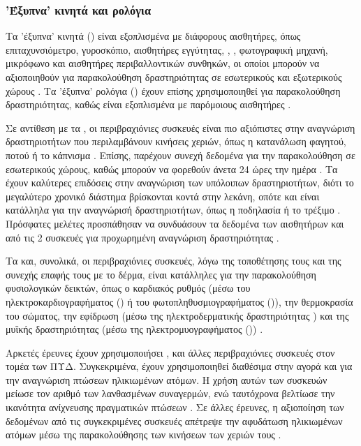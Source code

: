 \subsubsection{'Έξυπνα' κινητά και ρολόγια}
Τα 'έξυπνα' κινητά () είναι εξοπλισμένα με διάφορους αισθητήρες, όπως επιταχυνσιόμετρο, γυροσκόπιο, αισθητήρες εγγύτητας, , , φωτογραφική μηχανή, μικρόφωνο και αισθητήρες περιβαλλοντικών συνθηκών, οι οποίοι μπορούν να αξιοποιηθούν για παρακολούθηση δραστηριότητας σε εσωτερικούς και εξωτερικούς χώρους \cite{Incel2013}.
Τα 'έξυπνα' ρολόγια () έχουν επίσης χρησιμοποιηθεί για παρακολούθηση δραστηριότητας, καθώς είναι εξοπλισμένα με παρόμοιους αισθητήρες \cite{Chernbumroong2011}\cite{Sen2015}.
\par
Σε αντίθεση με τα , οι περιβραχιόνιες συσκευές είναι πιο αξιόπιστες στην αναγνώριση δραστηριοτήτων που περιλαμβάνουν κινήσεις χεριών, όπως η κατανάλωση φαγητού, ποτού ή το κάπνισμα \cite{Shoaib2016}.
Επίσης, παρέχουν συνεχή δεδομένα για την παρακολούθηση σε εσωτερικούς χώρους, καθώς μπορούν να φορεθούν άνετα 24 ώρες την ημέρα \cite{Bieber2013}\cite{Rawassizadeh2014}.
Τα  έχουν καλύτερες επιδόσεις στην αναγνώριση των υπόλοιπων δραστηριοτήτων, διότι το μεγαλύτερο χρονικό διάστημα βρίσκονται κοντά στην λεκάνη, οπότε και είναι κατάλληλα για την αναγνώρισή δραστηριοτήτων, όπως η ποδηλασία ή το τρέξιμο \cite{Shoaib2016}\cite{Bieber2013}.
Πρόσφατες μελέτες προσπάθησαν να συνδυάσουν τα δεδομένα των αισθητήρων και από τις 2 συσκευές για προχωρημένη αναγνώριση δραστηριότητας \cite{Shoaib2016}\cite{Casilari2015}.
\par
Τα  και, συνολικά, οι περιβραχιόνιες συσκευές, λόγω της τοποθέτησης τους και της συνεχής επαφής τους με το δέρμα, είναι κατάλληλες για την παρακολούθηση φυσιολογικών δεικτών, όπως ο καρδιακός ρυθμός (μέσω του ηλεκτροκαρδιογραφήματος () ή του φωτοπληθυσμιογραφήματος ()), την θερμοκρασία του σώματος, την εφίδρωση (μέσω της ηλεκτροδερματικής δραστηριότητας ) και της μυϊκής δραστηριότητας (μέσω της ηλεκτρομυογραφήματος ()) \cite{Rawassizadeh2014}\cite{Klonovs2016}.
\par
Αρκετές έρευνες έχουν χρησιμοποιήσει ,  και άλλες περιβραχιόνιες 
συσκευές στον τομέα των ΠΥΔ.
Συγκεκριμένα, έχουν χρησιμοποιηθεί διαθέσιμα στην αγορά  και  για την αναγνώριση πτώσεων ηλικιωμένων ατόμων.
Η χρήση αυτών των συσκευών μείωσε τον αριθμό των λανθασμένων συναγερμών, ενώ ταυτόχρονα βελτίωσε την ικανότητα ανίχνευσης πραγματικών πτώσεων \cite{Casilari2015}.
Σε άλλες έρευνες, η αξιοποίηση των δεδομένων από τις συγκεκριμένες συσκευές απέτρεψε την αφυδάτωση ηλικιωμένων ατόμων μέσω της παρακολούθησης των κινήσεων των χεριών τους \cite{Lutze2015}.

